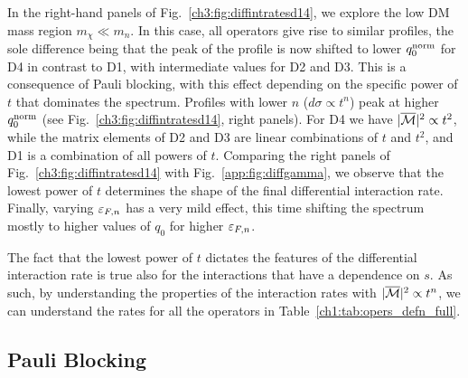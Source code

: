 In the right-hand panels of Fig.~\ref{ch3:fig:diffintratesd14}, we explore the low DM mass region $m_\chi\ll m_n$. 
In this case, all operators give rise to similar profiles, the sole difference being that the peak of the profile is now shifted to lower  $q_0^{\rm norm}$ for D4 in contrast to D1, with intermediate values for D2 and D3. This is a consequence of Pauli blocking, with this effect depending on the specific power of $t$ that dominates the spectrum. Profiles with lower $n$ ($d\sigma\propto t^n$) peak at higher $q_0^{\rm norm}$ (see Fig.~\ref{ch3:fig:diffintratesd14}, right panels). For D4 we have $|\overline{\mathcal M}|^2\propto t^2$, while the matrix elements of D2 and D3 are linear combinations of $t$ and $t^2$, and D1 is a combination of all powers of $t$. Comparing the right panels of Fig.~\ref{ch3:fig:diffintratesd14} with Fig.~\ref{app:fig:diffgamma}, we observe that the lowest power of $t$ determines the shape of the final differential interaction rate. Finally, varying $\varepsilon_{F,n}$ has a very mild effect, this time shifting the spectrum mostly to higher values of $q_0$ for higher $\varepsilon_{F,n}$.

The fact that the lowest power of $t$ dictates the features of the differential interaction rate is true also for the interactions that have a dependence on $s$. As such, by understanding the properties of the interaction rates with $|\overline{\mathcal M}|^2\propto t^n$, we can understand the rates for all the operators in Table~\ref{ch1:tab:opers_defn_full}.


\subsection{Pauli Blocking}
\label{ch3:subsec:PB_cap}

